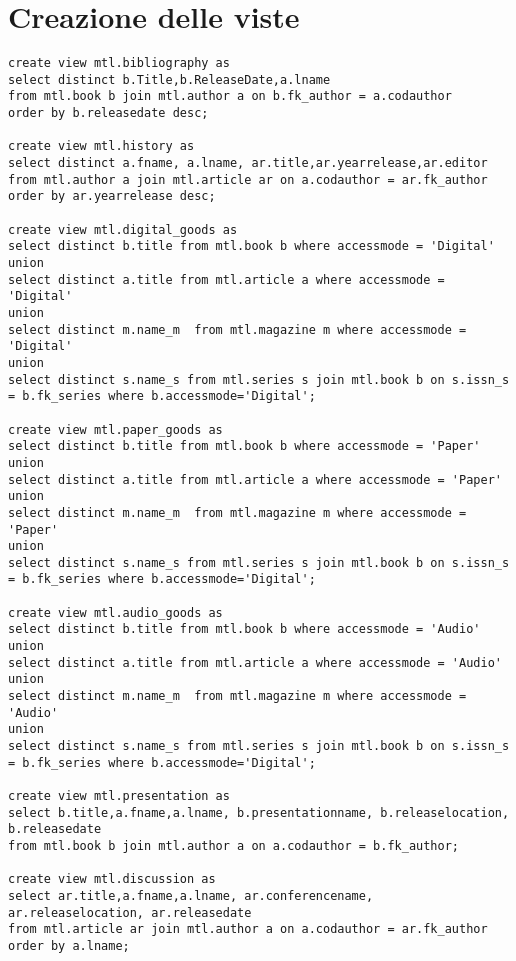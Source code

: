 \section{Creazione delle viste}
\begin{lstlisting}
create view mtl.bibliography as
select distinct b.Title,b.ReleaseDate,a.lname
from mtl.book b join mtl.author a on b.fk_author = a.codauthor
order by b.releasedate desc;

create view mtl.history as
select distinct a.fname, a.lname, ar.title,ar.yearrelease,ar.editor
from mtl.author a join mtl.article ar on a.codauthor = ar.fk_author
order by ar.yearrelease desc;

create view mtl.digital_goods as
select distinct b.title from mtl.book b where accessmode = 'Digital'
union
select distinct a.title from mtl.article a where accessmode = 'Digital'
union
select distinct m.name_m  from mtl.magazine m where accessmode = 'Digital'
union
select distinct s.name_s from mtl.series s join mtl.book b on s.issn_s = b.fk_series where b.accessmode='Digital';

create view mtl.paper_goods as
select distinct b.title from mtl.book b where accessmode = 'Paper'
union
select distinct a.title from mtl.article a where accessmode = 'Paper'
union
select distinct m.name_m  from mtl.magazine m where accessmode = 'Paper'
union
select distinct s.name_s from mtl.series s join mtl.book b on s.issn_s = b.fk_series where b.accessmode='Digital';

create view mtl.audio_goods as
select distinct b.title from mtl.book b where accessmode = 'Audio'
union
select distinct a.title from mtl.article a where accessmode = 'Audio'
union
select distinct m.name_m  from mtl.magazine m where accessmode = 'Audio'
union
select distinct s.name_s from mtl.series s join mtl.book b on s.issn_s = b.fk_series where b.accessmode='Digital';

create view mtl.presentation as
select b.title,a.fname,a.lname, b.presentationname, b.releaselocation, b.releasedate
from mtl.book b join mtl.author a on a.codauthor = b.fk_author;

create view mtl.discussion as
select ar.title,a.fname,a.lname, ar.conferencename, ar.releaselocation, ar.releasedate
from mtl.article ar join mtl.author a on a.codauthor = ar.fk_author
order by a.lname;
\end{lstlisting}



